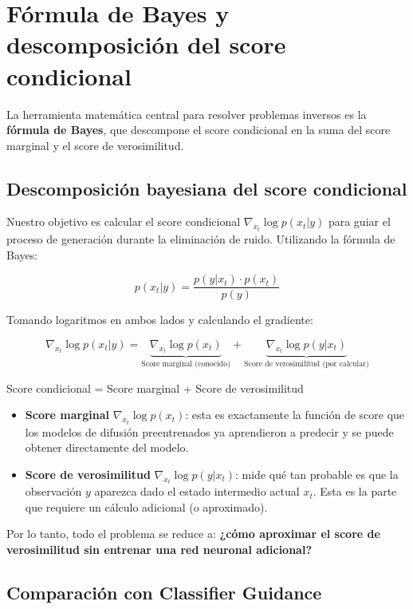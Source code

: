\section{Fórmula de Bayes y descomposición del score condicional}

La herramienta matemática central para resolver problemas inversos es la \textbf{fórmula de Bayes}, que descompone el score condicional en la suma del score marginal y el score de verosimilitud.

\subsection{Descomposición bayesiana del score condicional}

Nuestro objetivo es calcular el score condicional $\nabla_{x_t} \log p(x_t | y)$ para guiar el proceso de generación durante la eliminación de ruido. Utilizando la fórmula de Bayes:

$$
p(x_t | y) = \frac{p(y | x_t) \cdot p(x_t)}{p(y)}
$$

Tomando logaritmos en ambos lados y calculando el gradiente:

$$
\nabla_{x_t} \log p(x_t | y) = \underbrace{\nabla_{x_t} \log p(x_t)}_{\text{Score marginal (conocido)}} + \underbrace{\nabla_{x_t} \log p(y | x_t)}_{\text{Score de verosimilitud (por calcular)}}
$$

\begin{importantbox}{Score condicional = Score marginal + Score de verosimilitud}
\begin{itemize}
    \item \textbf{Score marginal} $\nabla_{x_t} \log p(x_t)$: esta es exactamente la función de score que los modelos de difusión preentrenados ya aprendieron a predecir y se puede obtener directamente del modelo.
    \item \textbf{Score de verosimilitud} $\nabla_{x_t} \log p(y | x_t)$: mide qué tan probable es que la observación $y$ aparezca dado el estado intermedio actual $x_t$. Esta es la parte que requiere un cálculo adicional (o aproximado).
\end{itemize}
Por lo tanto, todo el problema se reduce a: \textbf{¿cómo aproximar el score de verosimilitud sin entrenar una red neuronal adicional?}
\end{importantbox}

\subsection{Comparación con Classifier Guidance}

